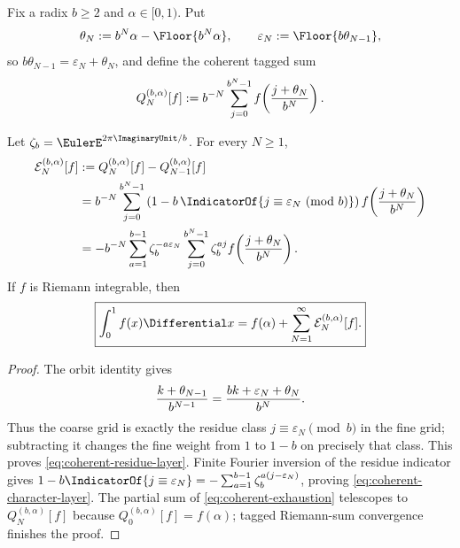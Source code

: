 Fix a radix $b\ge2$ and $\alpha\in[0,1)$.  Put
\begin{equation}
 \theta_N:=b^N\alpha-\Floor{b^N\alpha},
 \qquad
 \varepsilon_N:=\Floor{b\theta_{N-1}},
 \label{eq:coherent-radix-orbit}
\end{equation}
so $b\theta_{N-1}=\varepsilon_N+\theta_N$, and define the coherent tagged
sum
\begin{equation}
 Q_N^{(b,\alpha)}[f]
 :=b^{-N}\sum_{j=0}^{b^N-1}
 f\!\left({j+\theta_N\over b^N}\right).
 \label{eq:coherent-tagged-sum}
\end{equation}

\begin{theorem}
\label{thm:coherent-exhaustion}
Let $\zeta_b=\EulerE^{2\pi\ImaginaryUnit/b}$.  For every $N\ge1$,
\begin{align}
 \mathcal E_N^{(b,\alpha)}[f]
 &:=Q_N^{(b,\alpha)}[f]-Q_{N-1}^{(b,\alpha)}[f] \notag\\
 &=b^{-N}\sum_{j=0}^{b^N-1}
\left(1-b\,\IndicatorOf{j\equiv\varepsilon_N\ (\mathrm{mod}\ b)}\right)
 f\!\left({j+\theta_N\over b^N}\right)
 \label{eq:coherent-residue-layer}\\
 &=-b^{-N}\sum_{a=1}^{b-1}\zeta_b^{-a\varepsilon_N}
 \sum_{j=0}^{b^N-1}\zeta_b^{aj}
 f\!\left({j+\theta_N\over b^N}\right).
 \label{eq:coherent-character-layer}
\end{align}
If $f$ is Riemann integrable, then
\begin{equation}
 \boxed{\int_0^1f(x)\Differential x
 =f(\alpha)+\sum_{N=1}^{\infty}\mathcal E_N^{(b,\alpha)}[f].}
 \label{eq:coherent-exhaustion}
\end{equation}
\end{theorem}

\begin{proof}
The orbit identity gives
\[
 {k+\theta_{N-1}\over b^{N-1}}
 ={bk+\varepsilon_N+\theta_N\over b^N}.
\]
Thus the coarse grid is exactly the residue class
$j\equiv\varepsilon_N\pmod b$ in the fine grid; subtracting it changes
the fine weight from $1$ to $1-b$ on precisely that class.  This proves
\eqref{eq:coherent-residue-layer}.  Finite Fourier inversion of the residue
indicator gives
$1-b\IndicatorOf{j\equiv\varepsilon_N}=
-\sum_{a=1}^{b-1}\zeta_b^{a(j-\varepsilon_N)}$, proving
\eqref{eq:coherent-character-layer}.  The partial sum of
\eqref{eq:coherent-exhaustion} telescopes to $Q_N^{(b,\alpha)}[f]$ because
$Q_0^{(b,\alpha)}[f]=f(\alpha)$; tagged Riemann-sum convergence finishes
the proof.
\end{proof}

